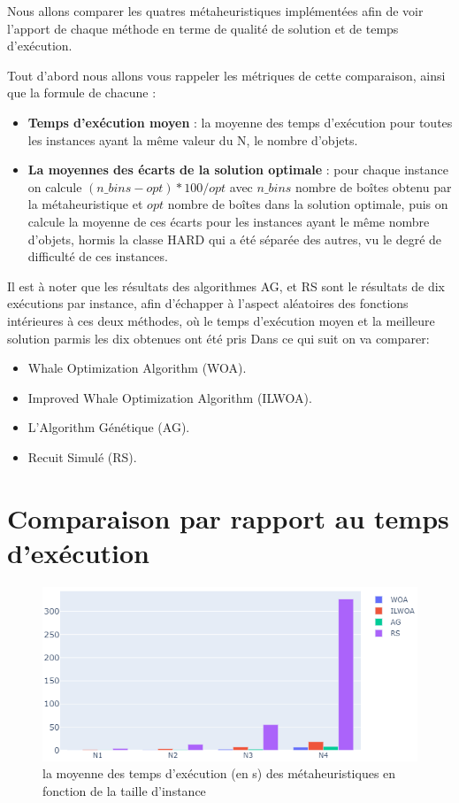 \documentclass[12pt]{article}
\begin{document}
    Nous allons comparer les quatres métaheuristiques implémentées afin de voir l’apport de chaque méthode en terme de qualité de solution et de temps d'exécution.

    Tout d’abord nous allons vous rappeler les métriques de cette comparaison, ainsi que la formule de chacune :
    \begin{itemize}
        \item \textbf{Temps d'exécution moyen} : la moyenne des temps d'exécution pour toutes les instances ayant la même valeur du N, le nombre d’objets.
        \item \textbf{La moyennes des écarts de la solution optimale} : pour chaque instance on calcule 
        \((n\_bins - opt)*100/opt\) avec \(n\_bins\) nombre de boîtes obtenu par la métaheuristique et \(opt\) nombre de boîtes dans la solution optimale, puis on calcule la moyenne de ces écarts pour les instances ayant le même nombre d’objets, hormis la classe HARD qui a été séparée des autres, vu le degré de difficulté de ces instances. 
    \end{itemize}

    Il est à noter que les résultats des algorithmes AG, et RS sont le résultats de dix exécutions par instance, afin d’échapper à l’aspect aléatoires des fonctions intérieures à ces deux méthodes, où le temps d'exécution moyen et la meilleure solution parmis les dix obtenues ont été pris
    Dans ce qui suit on va comparer:
    \begin{itemize}
        \item Whale Optimization Algorithm (WOA).
        \item Improved Whale Optimization Algorithm (ILWOA).
        \item L’Algorithm Génétique (AG).
        \item Recuit Simulé (RS).
    \end{itemize} 
    \section{Comparaison par rapport au temps d'exécution}
        \begin{figure}[H]
            \includegraphics[width=\linewidth]{../figures/mh_texec.png}
            \caption{la moyenne des temps d'exécution (en s) des métaheuristiques en fonction de la taille d'instance}
        \end{figure}
\end{document}
